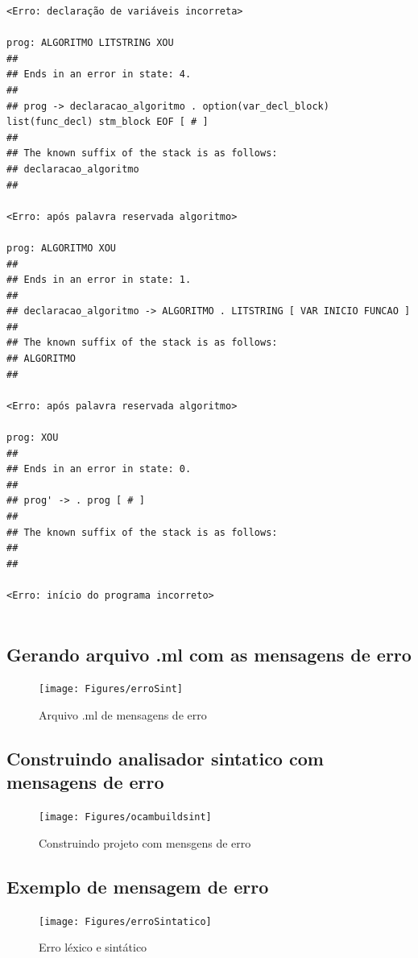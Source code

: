 \documentclass[hidelinks,12pt]{article}
\begin{document}
\begin{lstlisting}
<Erro: declaração de variáveis incorreta>

prog: ALGORITMO LITSTRING XOU 
##
## Ends in an error in state: 4.
##
## prog -> declaracao_algoritmo . option(var_decl_block) list(func_decl) stm_block EOF [ # ]
##
## The known suffix of the stack is as follows:
## declaracao_algoritmo 
##

<Erro: após palavra reservada algoritmo>

prog: ALGORITMO XOU 
##
## Ends in an error in state: 1.
##
## declaracao_algoritmo -> ALGORITMO . LITSTRING [ VAR INICIO FUNCAO ]
##
## The known suffix of the stack is as follows:
## ALGORITMO 
##

<Erro: após palavra reservada algoritmo>

prog: XOU 
##
## Ends in an error in state: 0.
##
## prog' -> . prog [ # ]
##
## The known suffix of the stack is as follows:
## 
##

<Erro: início do programa incorreto>


\end{lstlisting}	
	
\subsection{Gerando arquivo .ml com as mensagens de erro}
	\begin{figure}[h!]
		\centering
		\texttt{[image: Figures/erroSint]}
		\caption{Arquivo .ml de mensagens de erro}
	\end{figure}
	
\subsection{Construindo analisador sintatico com mensagens de erro}
	\begin{figure}[h!]
		\centering
		\texttt{[image: Figures/ocambuildsint]}
		\caption{Construindo projeto com mensgens de erro}
	\end{figure}
	
\newpage
\subsection{Exemplo de mensagem de erro}
	\begin{figure}[h!]
		\centering
		\texttt{[image: Figures/erroSintatico]}
		\caption{Erro léxico e sintático}
	\end{figure}


	
\clearpage
	
\end{document}
